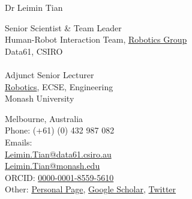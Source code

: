 \documentclass[11pt,letterpaper]{article}
\begin{document}

{\huge Dr Leimin Tian \\}
\smallskip

\begin{minipage}[b]{0.5\textwidth}
  Senior Scientist \& Team Leader\\
  Human-Robot Interaction Team, \href{https://research.csiro.au/robotics/}{Robotics Group}\\
  Data61, CSIRO\\
  \\Adjunct Senior Lecturer\\
  \href{https://www.monash.edu/engineering/robotics}{Robotics}, ECSE, Engineering\\
  Monash University
\end{minipage}
\hfill
\begin{minipage}[b]{0.45\textwidth}
  Melbourne, Australia \\
  Phone: (+61) (0) 432 987 082 \\
  Emails:\\
  \hspace*{1em}\href{mailto:Leimin.Tian@data61.csiro.au}{Leimin.Tian@data61.csiro.au} \\
  \hspace*{1em}\href{mailto:Leimin.Tian@monash.edu}{Leimin.Tian@monash.edu} \\
  ORCID: \href{https://orcid.org/0000-0001-8559-5610}{0000-0001-8559-5610}\\
  Other: \href{https://tianleimin.github.io/}{Personal Page}, \href{https://scholar.google.com/citations?hl=en&user=d-PQpWgAAAAJ&view_op=list_works&sortby=pubdate}{Google Scholar}, \href{https://twitter.com/LeiminTian}{Twitter}
\end{minipage}
\end{document}
